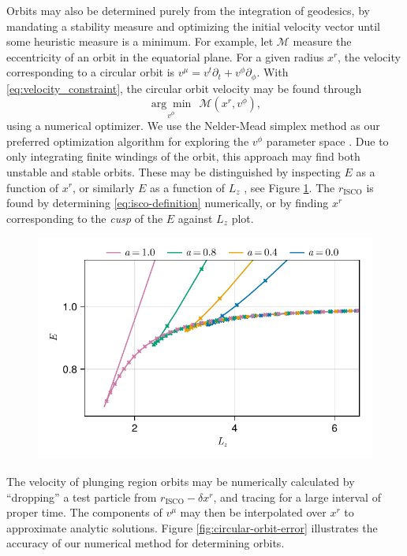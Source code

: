 Orbits may also be determined purely from the integration of geodesics, by mandating a stability measure and optimizing the initial velocity vector until some heuristic measure is a minimum. For example, let $\mathscr{M}$ measure the eccentricity of an orbit in the equatorial plane. For a given radius $x^r$, the velocity corresponding to a circular orbit is $v^\mu = v^t \partial_t + v^\phi \partial_\phi $. With \eqref{eq:velocity_constraint}, the circular orbit velocity may be found through
\begin{equation}
    \underset{v^\phi}{\arg \min}\ \ \mathscr{M}(x^r, v^\phi),
\end{equation}
using a numerical optimizer. We use the Nelder-Mead simplex method as our preferred optimization algorithm for exploring the $v^\phi$ parameter space \citep{nelder_simplex_1965}. Due to only integrating finite windings of the orbit, this approach may find both unstable and stable orbits. These may be distinguished by inspecting $E$ as a function of $x^r$, or similarly $E$ as a function of $L_z$ \citep{hackmann_charged_2013}, see Figure \ref{fig:e-lz-cusp}. The $r_\text{ISCO}$ is found by determining \eqref{eq:isco-definition} numerically, or by finding $x^r$ corresponding to the \textit{cusp} of the $E$ against $L_z$ plot.

\begin{figure}
    \centering
    \includegraphics[width=0.95\linewidth]{figures/circular-orbits.E-Lz.pdf}
    \caption{}
    \label{fig:e-lz-cusp}
\end{figure}

The velocity of plunging region orbits may be numerically calculated by ``dropping'' a test particle from $r_\text{ISCO} -  \delta x^r$, and tracing for a large interval of proper time. The components of $v^\mu$ may then be interpolated over $x^r$ to approximate analytic solutions. Figure \ref{fig:circular-orbit-error} illustrates the accuracy of our numerical method for determining orbits.

